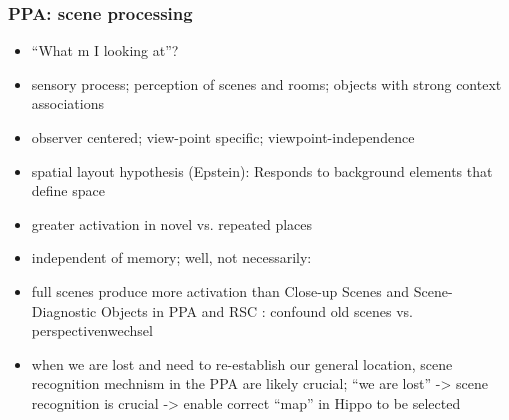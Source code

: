 \documentclass[10pt,a4paper,twocolumn]{article}
\begin{document}
\subsubsection*{PPA: scene processing}
\begin{itemize}
	\item ``What m I looking at''?
	\item sensory process; perception of scenes and rooms; objects with strong
	context associations
	\item observer centered; view-point specific; viewpoint-independence
	\item spatial layout hypothesis (Epstein): Responds to background elements
	that define space
	\item greater activation in novel vs. repeated places \citep{epstein_1999_parahippocampal_place_area}
	\item independent of memory; well, not necessarily: \citep{epstein_2007_scene_familar_unfamiliar,epstein_2005_visual_scene_processing}
	\item full scenes produce more activation than Close-up Scenes and Scene-Diagnostic
	Objects in PPA and RSC \citep{henderson_2008_full_scenes_vs_close-ups}:
	confound old scenes vs. perspectivenwechsel
	\item when we are lost and need to re-establish our general location, scene
	recognition mechnism in the PPA are likely crucial; ``we are lost''
	-> scene recognition is crucial -> enable correct ``map'' in Hippo
	to be selected
\end{itemize}
\end{document}
